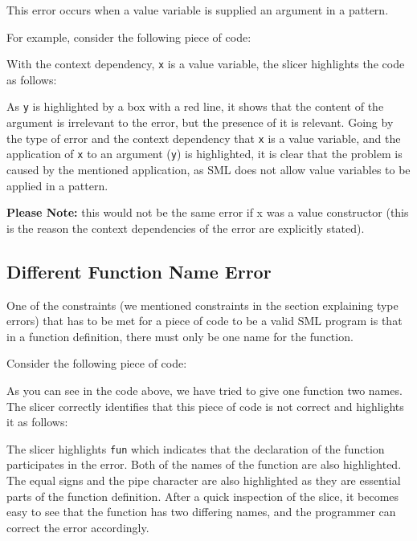 \documentclass{report}
\begin{document}
\begin{itemize}
\subitem This error occurs when a value variable is supplied an
argument in a pattern.

For example, consider the following piece of code:


With the context dependency, \texttt{x} is a value variable,
 the slicer highlights the code as follows:


As \texttt{y} is highlighted by a box with a red line, it shows
that the content of the argument is irrelevant to the error, but the
presence of it is relevant. Going by the type of error and the context
dependency that \texttt{x} is a value variable, and the
application of \texttt{x} to an argument (\texttt{y}) is
highlighted, it is clear that the problem is caused by the mentioned
application, as SML does not allow value variables to be applied in a
pattern.

\textbf{Please Note:} this would not be the same error if x was a value
constructor (this is the reason the context dependencies of the error are
explicitly stated).

\vspace{0.5in}


\subsection{Different Function Name Error}

  \subitem One of the constraints (we mentioned constraints in the
  section explaining type errors) that has to be met for a piece of
  code to be a valid SML program is that in a function definition,
  there must only be one name for the function.

Consider the following piece of code:


As you can see in the code above, we have tried to give one function
two names. The slicer correctly identifies that this piece of code is
not correct and highlights it as follows:


The slicer highlights \texttt{fun} which indicates that the
declaration of the function participates in the error. Both of the
names of the function are also highlighted. The equal signs and the
pipe character are also highlighted as they are essential parts of the
function definition. After a quick inspection of the slice, it becomes
easy to see that the function has two differing names, and the
programmer can correct the error accordingly.


\end{itemize}
\end{document}
